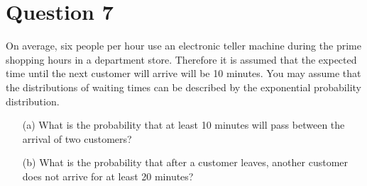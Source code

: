 \documentclass[]{article}
\begin{document}
\section*{Question 7}
On average, six people per hour use an electronic teller machine during the
prime shopping hours in a department store. Therefore it is assumed that
the expected time until the next customer will arrive will be 10 minutes.
You may assume that the distributions of waiting times can be described
by the exponential probability distribution.
\begin{itemize}
\item[(a)]  What is the probability that at least 10 minutes will pass
between the arrival of two customers?
\item[(b)]  What is the probability that after a customer leaves, another
customer does not arrive for at least 20 minutes?
\end{itemize}
\end{document}
